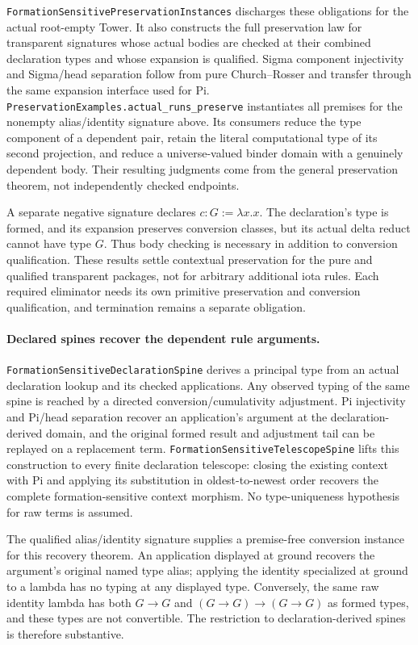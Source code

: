 \documentclass[11pt]{article}
\theoremstyle{definition}
\theoremstyle{remark}
\begin{document}
\nolinkurl{FormationSensitivePreservationInstances} discharges these
obligations for the actual root-empty Tower. It also constructs the full
preservation law for transparent signatures whose actual bodies are checked
at their combined declaration types and whose expansion is qualified.
Sigma component injectivity and Sigma/head separation follow from pure
Church--Rosser and transfer through the same expansion interface used for Pi.
\nolinkurl{PreservationExamples.actual_runs_preserve} instantiates all premises
for the nonempty alias/identity signature above. Its consumers reduce the
type component of a dependent pair, retain the literal computational type
of its second projection, and reduce a universe-valued binder domain with a
genuinely dependent body. Their resulting judgments come from the general
preservation theorem, not independently checked endpoints.

A separate negative signature declares $c:G:=\lambda x.x$. The declaration's
type is formed, and its expansion preserves conversion classes, but its actual
delta reduct cannot have type $G$. Thus body checking is necessary in addition
to conversion qualification. These results settle contextual preservation for
the pure and qualified transparent packages, not for arbitrary additional
iota rules. Each required eliminator needs its own primitive preservation and
conversion qualification, and termination remains a separate obligation.

\paragraph{Declared spines recover the dependent rule arguments.}
\nolinkurl{FormationSensitiveDeclarationSpine} derives a principal type from
an actual declaration lookup and its checked applications. Any observed
typing of the same spine is reached by a directed conversion/cumulativity
adjustment. Pi injectivity and Pi/head separation recover an application's
argument at the declaration-derived domain, and the original formed result
and adjustment tail can be replayed on a replacement term.
\nolinkurl{FormationSensitiveTelescopeSpine} lifts this construction to every
finite declaration telescope: closing the existing context with Pi and
applying its substitution in oldest-to-newest order recovers the complete
formation-sensitive context morphism. No type-uniqueness hypothesis for raw
terms is assumed.

The qualified alias/identity signature supplies a premise-free conversion
instance for this recovery theorem. An application displayed at ground
recovers the argument's original named type alias; applying the identity
specialized at ground to a lambda has no typing at any displayed type.
Conversely, the same raw identity lambda has both $G\to G$ and
$(G\to G)\to(G\to G)$ as formed types, and these types are not convertible.
The restriction to declaration-derived spines is therefore substantive.
\end{document}
